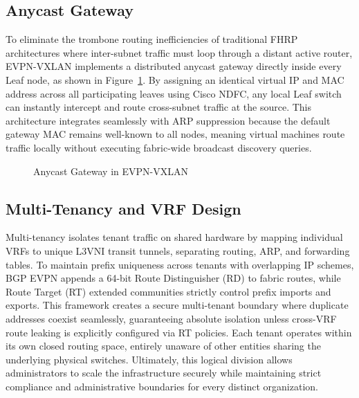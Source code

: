 \subsection*{Anycast Gateway}
To eliminate the trombone routing inefficiencies of traditional FHRP architectures where inter-subnet traffic must loop through a distant active router, EVPN-VXLAN implements a distributed anycast gateway directly inside every Leaf node, as shown in Figure~\ref{fig:AnycastGateway}. By assigning an identical virtual IP and MAC address across all participating leaves using Cisco NDFC, any local Leaf switch can instantly intercept and route cross-subnet traffic at the source. This architecture integrates seamlessly with ARP suppression because the default gateway MAC remains well-known to all nodes, meaning virtual machines route traffic locally without executing fabric-wide broadcast discovery queries.

\begin{figure}[!htbp]
        \centering
        \AnycastGateway
        \caption{Anycast Gateway in EVPN-VXLAN}
        \label{fig:AnycastGateway}
\end{figure}

\subsection*{Multi-Tenancy and VRF Design}
Multi-tenancy isolates tenant traffic on shared hardware by mapping individual VRFs to unique L3VNI transit tunnels, separating routing, ARP, and forwarding tables. To maintain prefix uniqueness across tenants with overlapping IP schemes, BGP EVPN appends a 64-bit Route Distinguisher (RD) to fabric routes, while Route Target (RT) extended communities strictly control prefix imports and exports. This framework creates a secure multi-tenant boundary where duplicate addresses coexist seamlessly, guaranteeing absolute isolation unless cross-VRF route leaking is explicitly configured via RT policies\cite{IETFRFC8365,VXLAN_Network_with_MP-BGP_EVPN_Control_Plane_Design_Guide}. Each tenant operates within its own closed routing space, entirely unaware of other entities sharing the underlying physical switches. Ultimately, this logical division allows administrators to scale the infrastructure securely while maintaining strict compliance and administrative boundaries for every distinct organization.

